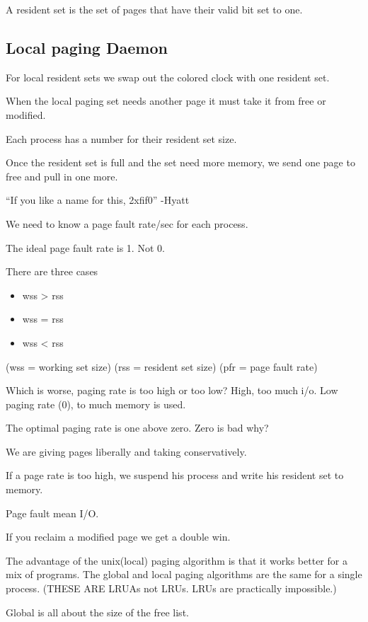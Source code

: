 \documentclass{article}
\begin{document}
A resident set is the set of pages that have their valid bit set to one.

\subsection*{Local paging Daemon}

For local resident sets we swap out the colored clock with one resident set.

When the local paging set needs another page it must take it from free or modified.

Each process has a number for their resident set size.

Once the resident set is full and the set need more memory, we send one page to free and pull in one more.

``If you like a name for this,  2xfif0'' -Hyatt

We need to know a page fault rate/sec for each process.

The ideal page fault rate is 1. Not 0.

There are three cases

\begin{itemize}
\item wss > rss
\item wss = rss
\item wss < rss
\end{itemize}

(wss = working set size)
(rss = resident set size)
(pfr = page fault rate)


Which is worse, paging rate is too high or too low? High, too much i/o.
Low paging rate (0), to much memory is used.

The optimal paging rate is one above zero. Zero is bad why?

We are giving pages liberally and taking conservatively.

If a page rate is too high, we suspend his process and write his resident set to memory.

Page fault mean I/O.

If you reclaim a modified page we get a double win.

The advantage of the unix(local) paging algorithm is that it works better for a mix of programs.
The global and local paging algorithms are the same for a single process.
(THESE ARE LRUAs not LRUs. LRUs are practically impossible.)

Global is all about the size of the free list.
\end{document}
